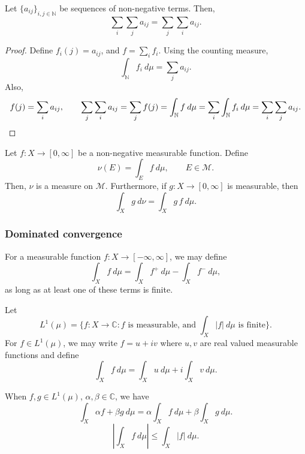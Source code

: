 \documentclass[11pt]{article}
\newcommand{\C}{\mathbb{C}}
\newcommand{\N}{\mathbb{N}}
\newcommand{\M}{\mathcal{M}}
\theoremstyle{definition}
\theoremstyle{remark}
\numberwithin{equation}{section}
\begin{document}
    \begin{lemma}
        Let $\{a_{ij}\}_{i,j \in \N}$ be sequences of non-negative terms. Then, \[
            \sum_i\sum_j a_{ij} = \sum_j\sum_i a_{ij}.
        \]
    \end{lemma}
    \begin{proof}
        Define $f_i(j) = a_{ij}$, and $f = \sum_i f_i$. Using the counting measure, \[
            \int_\N f_i\:d\mu = \sum_j a_{ij}.
        \] Also, \[
            f(j) = \sum_i a_{ij}, \qquad
            \sum_j\sum_i a_{ij} = \sum_j f(j) =
            \int_\N f\:d\mu = \sum_i\int_\N f_i\:d\mu = \sum_i\sum_j a_{ij}. \qedhere
        \]
    \end{proof}


    \begin{theorem}
        Let $f\colon X \to [0, \infty]$ be a non-negative measurable function. Define
        \[
            \nu(E) = \int_E f\:d\mu, \qquad E \in \M.
        \] Then, $\nu$ is a measure on $\M$. Furthermore, if $g\colon X \to [0,
        \infty]$ is measurable, then \[
            \int_X g\:d\nu = \int_X g\,f\:d\mu.
        \]
    \end{theorem}


    \subsubsection{Dominated convergence}

    \begin{definition}
        For a measurable function $f\colon X \to [-\infty, \infty]$, we may define \[
            \int_X f\:d\mu = \int_X f^+\:d\mu - \int_X f^-\:d\mu,
        \] as long as at least one of these terms is finite.
    \end{definition}

    \begin{definition}
        Let \[
            L^1(\mu) = \{f\colon X \to \C : f\text{ is measurable, and }\int_X
            |f|\:d\mu \text{ is finite}\}.
        \] For $f \in L^1(\mu)$, we may write $f = u + iv$ where $u, v$ are real
        valued measurable functions and define \[
            \int_X f\:d\mu = \int_X u\:d\mu + i\int_X v\:d\mu.
        \]
    \end{definition}

    \begin{lemma}
        When $f, g \in L^1(\mu)$, $\alpha, \beta \in \C$, we have \[
            \int_X \alpha f + \beta g \:d\mu = \alpha\int_X f\:d\mu + \beta\int_X
            g\:d\mu.
        \] \[
            \left|\int_X f \:d\mu \right| \leq \int_X |f| \:d\mu.
        \]
    \end{lemma}
\end{document}
